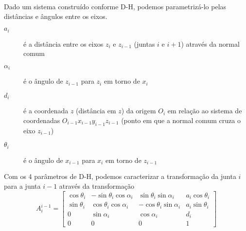 
Dado um sistema construído conforme D-H, podemos parametrizá-lo pelas distâncias e ângulos entre os eixos.

\begin{description}
    \item[$a_i$] é a distância entre os eixos $z_i$ e $z_{i-1}$ (juntas $i$ e $i+1$) através da normal comum 
    \item[$\alpha_i$] é o ângulo de $z_{i-1}$ para $z_i$ em torno de $x_i$
    \item[$d_i$] é a coordenada $z$ (distância em $z$) da origem $O_i$ em relação ao sistema de coordenadas $O_{i-1}x_{i-1}y_{i-1}z_{i-1}$ (ponto em que a normal comum cruza o eixo $z_{i-1}$)
    \item[$\theta_i$] é o ângulo de $x_{i-1}$ para $x_i$ em torno de $z_{i-1}$
\end{description}

Com os 4 parâmetros de D-H, podemos caracterizar a transformação da junta $i$ para a junta $i-1$ através da transformação \[
    A_i^{i-1} = \begin{bmatrix} \cos\theta_i & -\sin\theta_i \cos\alpha_i & \sin\theta_i \sin\alpha_i & a_i \cos\theta_i \\ \sin\theta_i & \cos\theta_i\cos\alpha_i & -\cos\theta_i\sin\alpha_i & a_i\sin\theta_i \\ 0 & \sin\alpha_i & \cos\alpha_i & d_i \\ 0&0&0&1 \end{bmatrix} 
\] 

